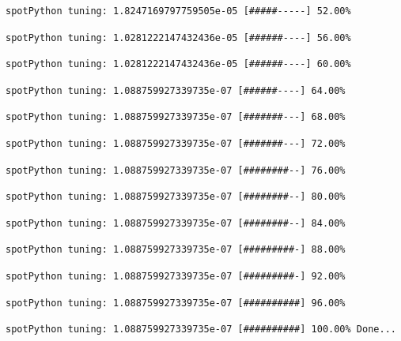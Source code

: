 \documentclass[
  letterpaper,
  DIV=11,
  numbers=noendperiod]{scrreprt}
\begin{document}
\begin{verbatim}
spotPython tuning: 1.8247169797759505e-05 [#####-----] 52.00% 
\end{verbatim}

\begin{verbatim}
spotPython tuning: 1.0281222147432436e-05 [######----] 56.00% 
\end{verbatim}

\begin{verbatim}
spotPython tuning: 1.0281222147432436e-05 [######----] 60.00% 
\end{verbatim}

\begin{verbatim}
spotPython tuning: 1.088759927339735e-07 [######----] 64.00% 
\end{verbatim}

\begin{verbatim}
spotPython tuning: 1.088759927339735e-07 [#######---] 68.00% 
\end{verbatim}

\begin{verbatim}
spotPython tuning: 1.088759927339735e-07 [#######---] 72.00% 
\end{verbatim}

\begin{verbatim}
spotPython tuning: 1.088759927339735e-07 [########--] 76.00% 
\end{verbatim}

\begin{verbatim}
spotPython tuning: 1.088759927339735e-07 [########--] 80.00% 
\end{verbatim}

\begin{verbatim}
spotPython tuning: 1.088759927339735e-07 [########--] 84.00% 
\end{verbatim}

\begin{verbatim}
spotPython tuning: 1.088759927339735e-07 [#########-] 88.00% 
\end{verbatim}

\begin{verbatim}
spotPython tuning: 1.088759927339735e-07 [#########-] 92.00% 
\end{verbatim}

\begin{verbatim}
spotPython tuning: 1.088759927339735e-07 [##########] 96.00% 
\end{verbatim}

\begin{verbatim}
spotPython tuning: 1.088759927339735e-07 [##########] 100.00% Done...
\end{verbatim}
\end{document}
